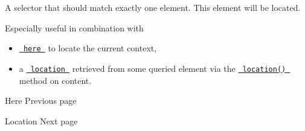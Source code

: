 A selector that should match exactly one element. This element will be
located.

Especially useful in combination with

\begin{itemize}
\tightlist
\item
  \href{/docs/reference/introspection/here/}{\texttt{\ here\ }} to
  locate the current context,
\item
  a
  \href{/docs/reference/introspection/location/}{\texttt{\ location\ }}
  retrieved from some queried element via the
  \href{/docs/reference/foundations/content/\#definitions-location}{\texttt{\ location()\ }}
  method on content.
\end{itemize}

\href{/docs/reference/introspection/here/}{\pandocbounded{}}

{ Here } { Previous page }

\href{/docs/reference/introspection/location/}{\pandocbounded{}}

{ Location } { Next page }

